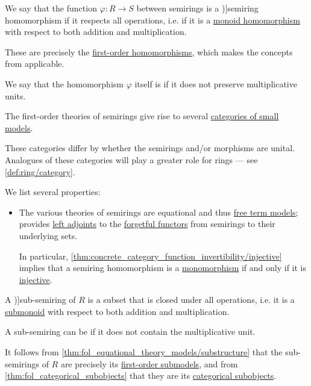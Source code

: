 \begin{definition}
\begin{thmenum}
     We say that the function \( \varphi: R \to S \) between semirings is a \term[en=morphism of semirings (\cite[105]{Golan1999Semirings})]{semiring homomorphism} if it respects all operations, i.e. if it is a \hyperref[def:monoid/morphism]{monoid homomorphism} with respect to both addition and multiplication.

    These are precisely the \hyperref[def:fol_homomorphism]{first-order homomorphisms}, which makes the concepts from  applicable.

    We say that the homomorphism \( \varphi \) itself is  if it does not preserve multiplicative units.

     The first-order theories of semirings give rise to several \hyperref[def:fol_theory_model_functor/obj]{categories of small models}.

    These categories differ by whether the semirings and/or morphisms are unital. Analogues of these categories will play a greater role for rings --- see \cref{def:ring/category}.

    We list several properties:
    \begin{itemize}
      \item The various theories of semirings are equational and thus \hyperref[def:fol_free_term_model]{free term models};  provides \hyperref[def:adjoint_functor]{left adjoints} to the \hyperref[def:fol_theory_forgetful_functor/set]{forgetful functors} from semirings to their underlying sets.

      In particular, \cref{thm:concrete_category_function_invertibility/injective} implies that a semiring homomorphism is a \hyperref[def:morphism_cancellation/left]{monomorphism} if and only if it is \hyperref[def:function_invertibility/injective]{injective}.
    \end{itemize}

     A \term[en=subsemiring (\cite[3]{Golan1999Semirings})]{sub-semiring} of \( R \) is a subset that is closed under all operations, i.e. it is a \hyperref[def:monoid/subobject]{submonoid} with respect to both addition and multiplication.

    A sub-semiring can be  if it does not contain the multiplicative unit.

    It follows from \cref{thm:fol_equational_theory_models/substructure} that the sub-semirings of \( R \) are precisely its \hyperref[def:fol_substructure/submodel]{first-order submodels}, and from \cref{thm:fol_categorical_subobjects} that they are its \hyperref[def:categorical_subobject]{categorical subobjects}.


\end{thmenum}
\end{definition}
